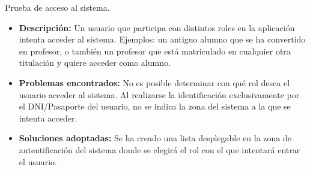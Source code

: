 \item Prueba de acceso al sistema.
  \begin{itemize}
    \item \textbf{Descripción:} Un usuario que participa con distintos roles en
      la aplicación intenta acceder al sistema. Ejemplos: un antiguo alumno que
      se ha convertido en profesor, o también un profesor que está matriculado
      en cualquier otra titulación y quiere acceder como alumno.
    \item \textbf{Problemas encontrados:} No es posible determinar con qué rol
      desea el usuario acceder al sistema. Al realizarse la identificación
      exclusivamente por el DNI/Pasaporte del usuario, no se indica la zona del
      sistema a la que se intenta acceder.
    \item \textbf{Soluciones adoptadas:} Se ha creado una lista desplegable
      en la zona de autentificación del sistema donde se elegirá el rol con
      el que intentará entrar el usuario.
  \end{itemize}

